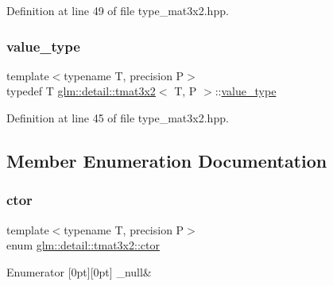 Definition at line 49 of file type\+\_\+mat3x2.\+hpp.

\mbox{\label{structglm_1_1detail_1_1tmat3x2_a3a0297927f3affe894622f9496b66db4}} 
\subsubsection{\texorpdfstring{value\+\_\+type}{value\_type}}
{\footnotesize\ttfamily template$<$typename T, precision P$>$ \\
typedef T \hyperlink{structglm_1_1detail_1_1tmat3x2}{glm\+::detail\+::tmat3x2}$<$ T, P $>$\+::\hyperlink{structglm_1_1detail_1_1tmat3x2_a3a0297927f3affe894622f9496b66db4}{value\+\_\+type}}



Definition at line 45 of file type\+\_\+mat3x2.\+hpp.



\subsection{Member Enumeration Documentation}
\mbox{\label{structglm_1_1detail_1_1tmat3x2_ae8783ababf4eb06fdbb048bb90ef3b03}} 
\subsubsection{\texorpdfstring{ctor}{ctor}}
{\footnotesize\ttfamily template$<$typename T, precision P$>$ \\
enum \hyperlink{structglm_1_1detail_1_1tmat3x2_ae8783ababf4eb06fdbb048bb90ef3b03}{glm\+::detail\+::tmat3x2\+::ctor}}

\begin{DoxyEnumFields}{Enumerator}
[0pt][0pt]{}\mbox{\label{structglm_1_1detail_1_1tmat3x2_ae8783ababf4eb06fdbb048bb90ef3b03a934418ab52e241503f37c54333bb848e}} 
\+\_\+null&\\
\hline

\end{DoxyEnumFields}


